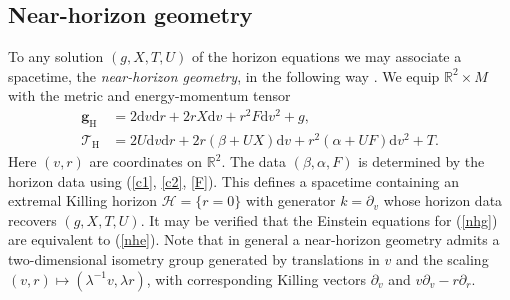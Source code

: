 \documentclass[11pt, reqno]{amsart}
\newcommand{\R}{\mathbb{R}}
\theoremstyle{plain}
\theoremstyle{definition}
\numberwithin{equation}{section}
\begin{document}
\subsection{Near-horizon geometry} \label{nhgs} To any solution $(g,X,T,U)$ of the horizon equations we may associate a spacetime, the \textit{near-horizon geometry}, in the following way \cite{KL13}. We equip $\R^2 \times M$ with the metric and energy-momentum tensor
\begin{subequations} \label{nhg}
\begin{align} \label{nhga}
    \textbf{g}_{\text{H}} &= 2\text{d}v\text{d}r + 2rX\text{d}v + r^2 F\text{d}v^2 + g, \\
    \mathcal{T}_{\text{H}} &= 2U\text{d}v\text{d}r + 2r(\beta + UX)\text{d}v + r^2(\alpha + UF)\text{d}v^2 +T. \label{nhgb}
    \end{align}
\end{subequations}
Here $(v,r)$ are coordinates on $\R^2$. The data $(\beta,\alpha,F)$ is determined by the horizon data using (\ref{c1}, \ref{c2}, \ref{F}). This defines a spacetime containing an extremal Killing horizon $\mathcal{H} = \{r=0\}$ with generator $k = \partial_v$ whose horizon data recovers $(g,X,T,U)$. It may be verified that the Einstein equations for (\ref{nhg}) are equivalent to (\ref{nhe}). Note that in general a near-horizon geometry admits a two-dimensional isometry group generated by translations in $v$ and the scaling $(v,r)\mapsto (\lambda^ {-1}v,\lambda r)$, with corresponding Killing vectors $\partial_v$ and $v\partial_v - r\partial_r$.
\end{document}
